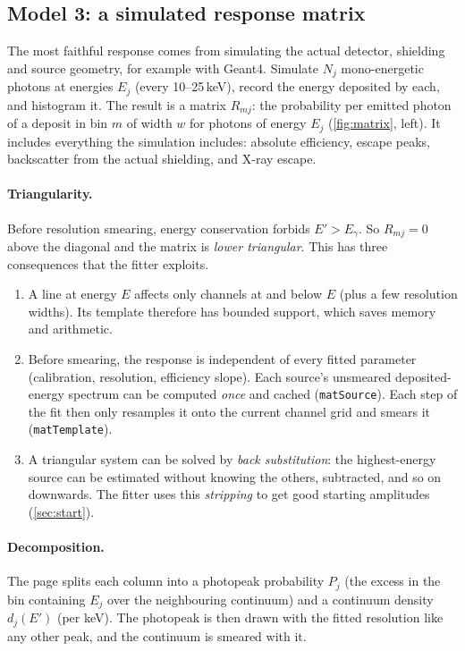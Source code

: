 \documentclass[11pt]{article}
\newcommand{\code}[1]{\texttt{#1}}
\begin{document}
\subsection{Model 3: a simulated response matrix}\label{sec:matrix}
The most faithful response comes from simulating the actual detector, shielding and source geometry, for example with Geant4. Simulate $N_j$ mono-energetic photons at energies $E_j$ (every 10--25\,keV), record the energy deposited by each, and histogram it. The result is a matrix $R_{mj}$: the probability per emitted photon of a deposit in bin $m$ of width $w$ for photons of energy $E_j$ (\cref{fig:matrix}, left). It includes everything the simulation includes: absolute efficiency, escape peaks, backscatter from the actual shielding, and X-ray escape.

\paragraph{Triangularity.} Before resolution smearing, energy conservation forbids $E' > E_\gamma$. So $R_{mj} = 0$ above the diagonal and the matrix is \emph{lower triangular}. This has three consequences that the fitter exploits.
\begin{enumerate}[nosep]
\item A line at energy $E$ affects only channels at and below $E$ (plus a few resolution widths). Its template therefore has bounded support, which saves memory and arithmetic.
\item Before smearing, the response is independent of every fitted parameter (calibration, resolution, efficiency slope). Each source's unsmeared deposited-energy spectrum can be computed \emph{once} and cached (\code{matSource}). Each step of the fit then only resamples it onto the current channel grid and smears it (\code{matTemplate}).
\item A triangular system can be solved by \emph{back substitution}: the highest-energy source can be estimated without knowing the others, subtracted, and so on downwards. The fitter uses this \emph{stripping} to get good starting amplitudes (\cref{sec:start}).
\end{enumerate}

\paragraph{Decomposition.} The page splits each column into a photopeak probability $P_j$ (the excess in the bin containing $E_j$ over the neighbouring continuum) and a continuum density $d_j(E')$ (per keV). The photopeak is then drawn with the fitted resolution like any other peak, and the continuum is smeared with it.
\end{document}
